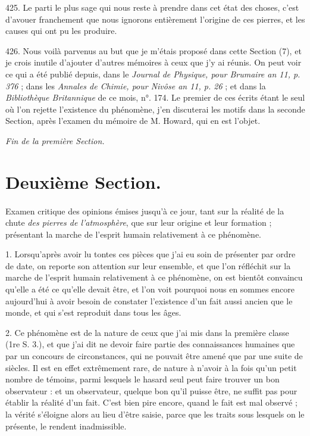 \documentclass[a4paper, 11pt, oneside, polutonikogreek, french]{article}
\begin{document}
425. Le parti le plus sage qui nous reste à prendre dans cet état des choses, c'est d'avouer franchement que nous ignorons entièrement l'origine de ces pierres, et les causes qui ont pu les produire.

426. Nous voilà parvenus au but que je m'étais proposé dans cette Section (7), et je crois inutile d'ajouter d'autres mémoires à ceux que j'y ai réunis. On peut voir ce qui a été publié depuis, dans le \emph{Journal de Physique, pour Brumaire an 11, p. 376} ; dans les \emph{Annales de Chimie, pour Nivôse an 11, p. 26} ; et dans la \emph{Bibliothèque Britannique} de ce mois, n°. 174. Le premier de ces écrits étant le seul où l'on rejette l'existence du phénomène, j'en discuterai les motifs dans la seconde Section, après l'examen du mémoire de M. Howard, qui en est l'objet.

\begin{center}
\emph{Fin de la première Section.}
\end{center}
\clearpage
\section{Deuxième Section.}
\paragraph{}
Examen critique des opinions émises jusqu'à ce jour, tant sur la réalité de la chute \emph{des pierres de l'atmosphère}, que sur leur origine et leur formation ; présentant la marche de l'esprit humain relativement à ce phénomène.

1. Lorsqu’après avoir lu tontes ces pièces que j'ai eu soin de présenter par ordre de date, on reporte son attention sur leur ensemble, et que l'on réfléchit sur la marche de l'esprit humain relativement à ce phénomène, on est bientôt convaincu qu'elle a été ce qu'elle devait être, et l'on voit pourquoi nous en sommes encore aujourd'hui à avoir besoin de constater l'existence d'un fait aussi ancien que le monde, et qui s'est reproduit dans tous les âges.

2. Ce phénomène est de la nature de ceux que j'ai mis dans la première classe (1re S. 3.), et que j'ai dit ne devoir faire partie des connaissances humaines que par un concours de circonstances, qui ne pouvait être amené que par une suite de siècles. Il est en effet extrêmement rare, de nature à n'avoir à la fois qu'un petit nombre de témoins, parmi lesquels le hasard seul peut faire trouver un bon observateur : et un observateur, quelque bon qu'il puisse être, ne suffit pas pour établir la réalité d'un fait. C'est bien pire encore, quand le fait est mal observé ; la vérité s'éloigne alors au lieu d'être saisie, parce que les traits sous lesquels on le présente, le rendent inadmissible.
\end{document}
